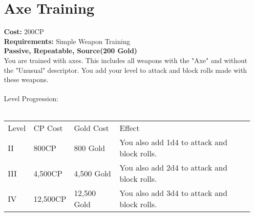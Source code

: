 \section{Axe Training}\label{perk:axeTraining}
\textbf{Cost:} 200CP\\
\textbf{Requirements:} Simple Weapon Training\\
\textbf{Passive, Repeatable, Source(200 Gold)}\\
You are trained with axes.
This includes all weapons with the "Axe" and without the "Unusual" descriptor.
You add your level to attack and block rolls made with these weapons.\\
\\
Level Progression:\\
\\
\begin{tabular}{l | l | l | l}
	Level & CP Cost & Gold Cost & Effect\\
	II & 800CP & 800 Gold & You also add 1d4 to attack and block rolls.\\
	III & 4,500CP & 4,500 Gold & You also add 2d4 to attack and block rolls.\\
	IV & 12,500CP & 12,500 Gold & You also add 3d4 to attack and block rolls.\\
\end{tabular}